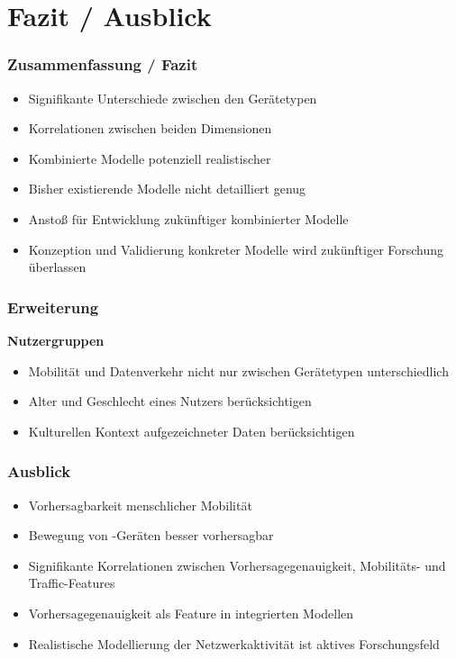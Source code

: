 \documentclass{beamer}
\begin{document}
\section{Fazit / Ausblick}

\begin{frame}
  \frametitle{Zusammenfassung / Fazit}
  \begin{itemize}
    \item Signifikante Unterschiede zwischen den Gerätetypen
    \item Korrelationen zwischen beiden Dimensionen
    \item Kombinierte Modelle potenziell realistischer
    \item Bisher existierende Modelle nicht detailliert genug
    \item Anstoß für Entwicklung zukünftiger kombinierter Modelle
    \item Konzeption und Validierung konkreter Modelle wird zukünftiger Forschung überlassen
  \end{itemize}  
\end{frame}

\begin{frame}
  \frametitle{Erweiterung}
  \textbf{Nutzergruppen}
  \begin{itemize}
    \item Mobilität und Datenverkehr nicht nur zwischen Gerätetypen unterschiedlich
    \item Alter und Geschlecht eines Nutzers berücksichtigen
    \item Kulturellen Kontext aufgezeichneter Daten berücksichtigen    
  \end{itemize}
\end{frame}

\begin{frame}
  \frametitle{Ausblick}
  \textit{}\newline
  \begin{itemize}
    \item Vorhersagbarkeit menschlicher Mobilität
    \item Bewegung von -Geräten besser vorhersagbar
    \item Signifikante Korrelationen zwischen Vorhersagegenauigkeit, Mobilitäts- und Traffic-Features
    \item Vorhersagegenauigkeit als Feature in integrierten Modellen
    \item Realistische Modellierung der Netzwerkaktivität ist aktives Forschungsfeld
  \end{itemize}  
\end{frame}
\end{document}
